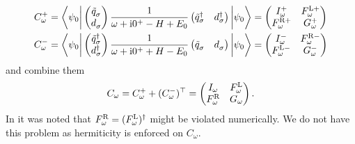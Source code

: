 \begin{subequations}
    \begin{align}
        C^+_\omega
         & =
        \biggl\langle \psi_0 \biggr|
        \begin{pmatrix}
            \tilde q^{\pdag}_\sigma \\
            d^{\pdag}_\sigma
        \end{pmatrix}
        \frac{1}{\omega + \mi0^+ - H + E_0}
        \begin{pmatrix}
            \tilde q^\dag_\sigma & d^\dag_\sigma
        \end{pmatrix}
        \biggl| \psi_0 \biggr\rangle
        =
        \begin{pmatrix}
            I^+_\omega      & F^{\mL+}_\omega \\
            F^{\mR+}_\omega & G^+_\omega
        \end{pmatrix} \\
        C^-_\omega
         & =
        \biggl\langle \psi_0 \biggr|
        \begin{pmatrix}
            \tilde q^\dag_\sigma \\
            d^\dag_\sigma
        \end{pmatrix}
        \frac{1}{\omega + \mi0^+ + H - E_0}
        \begin{pmatrix}
            \tilde q^{\pdag}_\sigma & d^{\pdag}_\sigma
        \end{pmatrix}
        \biggl| \psi_0 \biggr\rangle
        =
        \begin{pmatrix}
            I^-_\omega      & F^{\mR-}_\omega \\
            F^{\mL-}_\omega & G^-_\omega
        \end{pmatrix}
    \end{align}
\end{subequations}
and combine them
\begin{equation}
    C_\omega
    =
    C^+_\omega + (C^-_\omega)^\top
    =
    \begin{pmatrix}
        I_\omega       & F^{\mathrm{L}}_\omega \\
        F^{\mathrm{R}}_\omega & G_\omega
    \end{pmatrix}.
\end{equation}
In \cite{Kugler2022} it was noted that $F^{\mathrm{R}}_\omega = (F^{\mathrm{L}}_\omega)^\dag$
might be violated numerically.
We do not have this problem as hermiticity is enforced on $C_\omega$.

